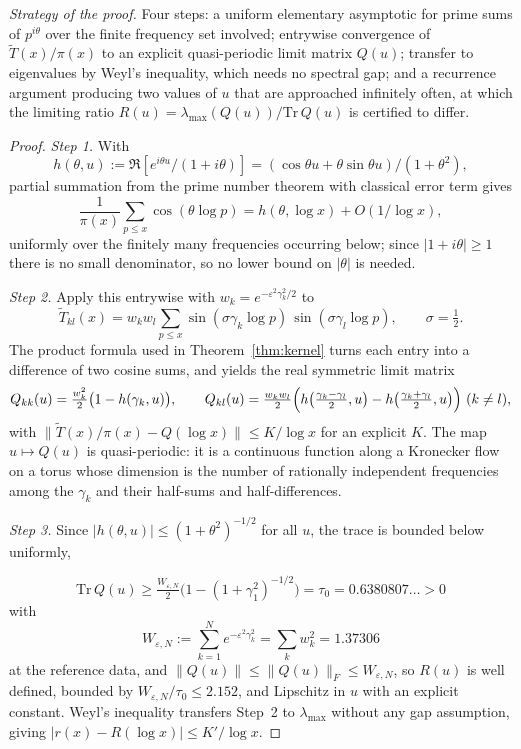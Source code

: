 \documentclass[11pt]{article}
\newcommand{\Tt}{\widetilde{T}}
\newcommand{\WeN}{W_{\varepsilon,N}}
\begin{document}
\emph{Strategy of the proof.} Four steps: a uniform elementary asymptotic for
prime sums of $p^{i\theta}$ over the finite frequency set involved; entrywise
convergence of $\Tt(x)/\pi(x)$ to an explicit quasi-periodic limit matrix
$Q(u)$; transfer to eigenvalues by Weyl's inequality, which needs no spectral
gap; and a recurrence argument producing two values of $u$ that are approached
infinitely often, at which the limiting ratio
$R(u)=\lambda_{\max}(Q(u))/\mathrm{Tr}\,Q(u)$ is certified to differ.

\begin{proof}
\textit{Step 1.} With 
\[
h(\theta,u):=\Re[e^{i\theta u}/(1+i\theta)]
=(\cos\theta u+\theta\sin\theta u)/(1+\theta^2),
\]
 partial summation from the
prime number theorem with classical error term gives
\[
\frac{1}{\pi(x)}\sum_{p\le x}\cos(\theta\log p)=h(\theta,\log x)+O(1/\log x),
\]
uniformly over the finitely many frequencies occurring below; since
$|1+i\theta|\ge 1$ there is no small denominator, so no lower bound on
$|\theta|$ is needed.

\textit{Step 2.} Apply this entrywise with
$w_k=e^{-\varepsilon^2\gamma_k^2/2}$ to
\[
\Tt_{kl}(x)=w_kw_l\sum_{p\le x}\sin(\sigma\gamma_k\log p)\,
\sin(\sigma\gamma_l\log p),\qquad \sigma=\tfrac12 .
\]
The product formula used in
Theorem~\ref{thm:kernel} turns each entry into a difference of two cosine
sums, and yields the real symmetric limit matrix
\[
Q_{kk}(u)=\tfrac{w_k^2}{2}\bigl(1-h(\gamma_k,u)\bigr),
\qquad
Q_{kl}(u)=\tfrac{w_kw_l}{2}
\Bigl(h\bigl(\tfrac{\gamma_k-\gamma_l}{2},u\bigr)
     -h\bigl(\tfrac{\gamma_k+\gamma_l}{2},u\bigr)\Bigr)\ (k\neq l),
\]
with $\|\Tt(x)/\pi(x)-Q(\log x)\|\le K/\log x$ for an explicit $K$. The map
$u\mapsto Q(u)$ is quasi-periodic: it is a continuous function along a
Kronecker flow on a torus whose dimension is the number of rationally
independent frequencies among the $\gamma_k$ and their half-sums and
half-differences.

\textit{Step 3.} Since $|h(\theta,u)|\le(1+\theta^2)^{-1/2}$ for all $u$, the
trace is bounded below uniformly,

\[
\mathrm{Tr}\,Q(u)\ge\tfrac{\WeN}{2}\bigl(1-(1+\gamma_1^2)^{-1/2}\bigr)
=\tau_0=0.6380807\ldots>0
\]
 with
\[
\WeN:=\sum_{k=1}^{N}e^{-\varepsilon^2\gamma_k^2}=\sum_k w_k^2=1.37306
\]
at the reference data, and
$\|Q(u)\|\le\|Q(u)\|_F\le \WeN$, so $R(u)$ is well defined, bounded by
$\WeN/\tau_0\le 2.152$, and Lipschitz in $u$ with an explicit constant.
Weyl's inequality transfers Step~2 to $\lambda_{\max}$ without any gap
assumption, giving $|r(x)-R(\log x)|\le K'/\log x$.


\end{proof}
\end{document}
